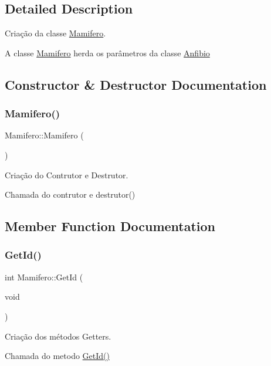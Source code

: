 \subsection{Detailed Description}
Criação da classe \mbox{\hyperlink{class_mamifero}{Mamifero}}. 

A classe \mbox{\hyperlink{class_mamifero}{Mamifero}} herda os parâmetros da classe \mbox{\hyperlink{class_anfibio}{Anfibio}} 

\subsection{Constructor \& Destructor Documentation}
\mbox{\label{class_mamifero_adc6af2531b40fb6b0bc91cb5bbb205e8}} 
\subsubsection{\texorpdfstring{Mamifero()}{Mamifero()}}
{\footnotesize\ttfamily Mamifero\+::\+Mamifero (\begin{DoxyParamCaption}{ }\end{DoxyParamCaption})}



Criação do Contrutor e Destrutor. 

Chamada do contrutor e destrutor() 

\subsection{Member Function Documentation}
\mbox{\label{class_mamifero_ae7433cef065a2d6b76f510efc4f3e7db}} 
\subsubsection{\texorpdfstring{Get\+Id()}{GetId()}}
{\footnotesize\ttfamily int Mamifero\+::\+Get\+Id (\begin{DoxyParamCaption}\item[{void}]{ }\end{DoxyParamCaption})}



Criação dos métodos Getters. 

Chamada do metodo \mbox{\hyperlink{class_mamifero_ae7433cef065a2d6b76f510efc4f3e7db}{Get\+Id()}} \mbox{\label{class_mamifero_af4889c9c225884eae0f5da5db0eb9bf3}} 
